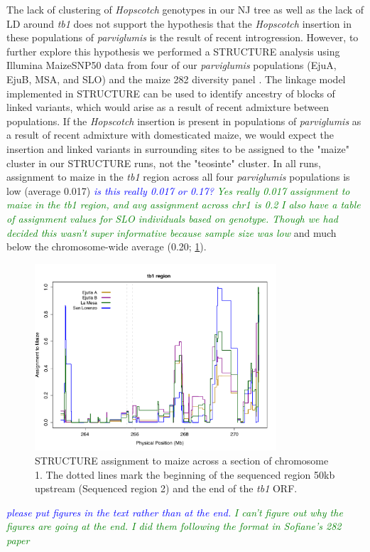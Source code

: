 \documentclass[11pt]{article}
\newcommand{\jri}[1]{\textcolor{blue}{ \emph{\scriptsize  #1}} }
\newcommand{\lev}[1]{\textcolor{green}{\emph{\scriptsize #1}} }
\begin{document}
\begin{linenumbers}
\begin{flushleft}
The lack of clustering of \emph{Hopscotch} genotypes in our NJ tree as well as the lack of LD around \emph{tb1} does not support the hypothesis that the \emph{Hopscotch} insertion in these populations of \emph{parviglumis} is the result of recent introgression. However, to further explore this hypothesis we performed a STRUCTURE analysis using Illumina MaizeSNP50 data from four of our \emph{parviglumis} populations (EjuA, EjuB, MSA, and SLO) and the maize 282 diversity panel \citep{Cook2012, Pyhajarvi2013}. The linkage model implemented in STRUCTURE can be used to identify ancestry of blocks of linked variants, which would arise as a result of recent admixture between populations. If the \emph{Hopscotch} insertion is present in populations of \emph{parviglumis} as a result of recent admixture with domesticated maize, we would expect the insertion and linked variants in surrounding sites to be assigned to the "maize" cluster in our STRUCTURE runs, not the "teosinte" cluster. In all runs, assignment to maize in the \emph{tb1} region across all four \emph{parviglumis} populations is low (average 0.017) \jri{is this really 0.017 or 0.17?} \lev{Yes really 0.017 assignment to maize in the tb1 region, and avg assignment across chr1 is 0.2} \lev{ I also have a table of assignment values for SLO individuals based on genotype. Though we had decided this wasn't super informative because sample size was low} and much below the chromosome-wide average (0.20; \ref{Fig3Structure}). 

\begin{figure}[!t]
  \begin{center}
   \includegraphics[width=90mm]{Fig3Structure.pdf}
    \caption{STRUCTURE assignment to maize across a section of chromosome 1. The dotted lines mark the beginning of the sequenced region 50kb upstream (Sequenced region 2) and the end of the \emph{tb1} ORF. } 
\label{Fig3Structure}
  \end{center}
\end{figure}
\jri{please put figures in the text rather than at the end.} \lev{I can't figure out why the figures are going at the end. I did them following the format in Sofiane's 282 paper}


\end{flushleft}
\end{linenumbers}
\end{document}
